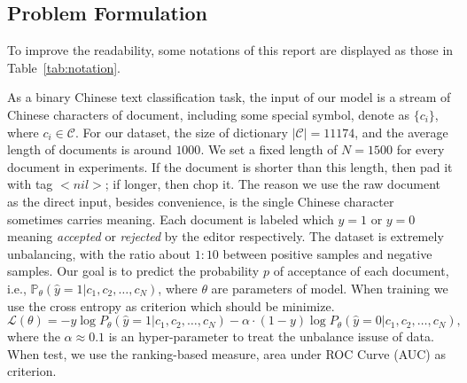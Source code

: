 \documentclass{article}
\begin{document}
\subsection{Problem Formulation}\label{sec:formulate}

To improve the readability, some notations of this report are displayed as those in Table~\ref{tab:notation}.

\begin{table}[htbp!]
\small
\renewcommand{\arraystretch}{1}
\centering
\caption{Partial notations and descriptions in this report}\label{tab:notation}
\end{table}

As a binary Chinese text classification task, the input of our model is a stream of Chinese characters of document, including some special symbol, denote as $\{c_i\}$, where $c_i \in \mathcal C$. For our dataset, the size of dictionary $|\mathcal C| = 11174$, and the average length of documents is around $1000$. We set a fixed length of $N = 1500$ for every document in experiments. If the document is shorter than this length, then pad it with tag $<nil>$; if longer, then chop it. The reason we use the raw document as the direct input, besides convenience, is the single Chinese character sometimes carries meaning. Each document is labeled which $y = 1$ or $y = 0$ meaning {\em accepted} or {\em rejected} by the editor respectively. The dataset is extremely unbalancing, with the ratio about $1:10$ between positive samples and negative samples. Our goal is to predict the probability $p$ of acceptance of each document, i.e., $\mathbb P_\theta(\hat{y}=1|c_1, c_2, \dots, c_N)$, where $\theta$ are parameters of model. When training we use the cross entropy as criterion which should be minimize.
\[\mathcal L(\theta) = - y \log P_\theta(\hat{y}=1|c_1, c_2, \dots, c_N) - \alpha \cdot (1-y)\log P_\theta(\hat{y}=0|c_1, c_2, \dots, c_N),\]
where the $\alpha \approx 0.1 $ is an hyper-parameter to treat the unbalance issuse of data. When test, we use the ranking-based measure, area under ROC Curve (AUC) as criterion.
\end{document}
